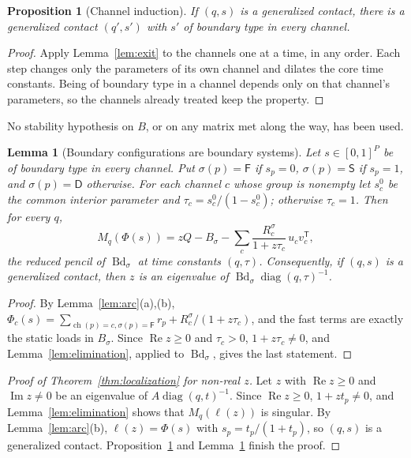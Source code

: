 \documentclass[11pt,a4paper]{article}
\theoremstyle{plain}
\newtheorem{proposition}[theorem]{Proposition}
\newtheorem{lemma}[theorem]{Lemma}
\theoremstyle{definition}
\theoremstyle{remark}
\newcommand{\Real}{\operatorname{Re}}
\newcommand{\Imag}{\operatorname{Im}}
\newcommand{\diag}{\operatorname{diag}}
\newcommand{\Bd}{\operatorname{Bd}}
\newcommand{\ch}{\operatorname{ch}}
\newcommand{\rF}{\mathsf{F}}
\newcommand{\rS}{\mathsf{S}}
\newcommand{\rD}{\mathsf{D}}
\newcommand{\T}{\mathsf{T}}
\begin{document}
\begin{proposition}[Channel induction]\label{prop:induction}
If $(q,s)$ is a generalized contact, there is a generalized contact $(q',s')$ with $s'$ of
boundary type in every channel.
\end{proposition}

\begin{proof}
Apply Lemma~\ref{lem:exit} to the channels one at a time, in any order. Each step changes
only the parameters of its own channel and dilates the core time constants. Being of
boundary type in a channel depends only on that channel's parameters, so the channels
already treated keep the property.
\end{proof}

No stability hypothesis on $B$, or on any matrix met along the way, has been used.

\begin{lemma}[Boundary configurations are boundary systems]\label{lem:boundary}
Let $s\in[0,1]^P$ be of boundary type in every channel. Put $\sigma(p)=\rF$ if $s_p=0$,
$\sigma(p)=\rS$ if $s_p=1$, and $\sigma(p)=\rD$ otherwise. For each channel $c$ whose
group is nonempty let $s^0_c$ be the common interior parameter and
$\tau_c=s^0_c/(1-s^0_c)$; otherwise $\tau_c=1$. Then for every $q$,
\[
  M_q(\Phi(s))=zQ-B_\sigma-\sum_{c}\frac{R^\sigma_c}{1+z\tau_c}\,u_cv_c^\T ,
\]
the reduced pencil of $\Bd_\sigma$ at time constants $(q,\tau)$. Consequently, if $(q,s)$ is
a generalized contact, then $z$ is an eigenvalue of $\Bd_\sigma\diag(q,\tau)^{-1}$.
\end{lemma}

\begin{proof}
By Lemma~\ref{lem:arc}(a),(b), $\Phi_c(s)=\sum_{\ch(p)=c,\sigma(p)=\rF}r_p+
R^\sigma_c/(1+z\tau_c)$, and the fast terms are exactly the static loads in $B_\sigma$.
Since $\Real z\ge0$ and $\tau_c>0$, $1+z\tau_c\ne0$, and Lemma~\ref{lem:elimination},
applied to $\Bd_\sigma$, gives the last statement.
\end{proof}

\begin{proof}[Proof of Theorem~\ref{thm:localization} for non-real $z$]
Let $z$ with $\Real z\ge0$ and $\Imag z\ne0$ be an eigenvalue of
$A\diag(q,t)^{-1}$. Since $\Real z\ge0$, $1+zt_p\ne0$, and Lemma~\ref{lem:elimination}
shows that $M_q(\ell(z))$ is singular. By Lemma~\ref{lem:arc}(b),
$\ell(z)=\Phi(s)$ with $s_p=t_p/(1+t_p)$, so $(q,s)$ is a generalized contact.
Proposition~\ref{prop:induction} and Lemma~\ref{lem:boundary} finish the proof.
\end{proof}
\end{document}
